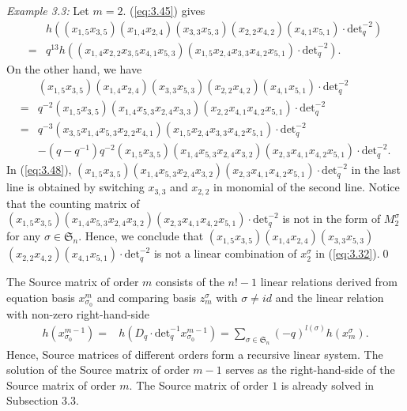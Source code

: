 \documentclass[table,a4paper,reqno]{amsart}
\numberwithin{equation}{section}
\theoremstyle{definition}
\begin{document}
\textit{Example 3.3:} Let $m=2$. (\ref{eq:3.45}) gives
\begin{equation}
    \begin{split}
        &h\left((x_{1,5}x_{3,5})(x_{1,4}x_{2,4})(x_{3,3}x_{5,3})(x_{2,2}x_{4,2})(x_{4,1}x_{5,1})\cdot\text{det}_q^{-2}\right)\\
    =&q^{13}h\left((x_{1,4}x_{2,2}x_{3,5}x_{4,1}x_{5,3})(x_{1,5}x_{2,4}x_{3,3}x_{4,2}x_{5,1})\cdot\text{det}_q^{-2}\right).
    \end{split}
\end{equation}
On the other hand, we have
\begin{equation}\label{eq:3.48}
    \begin{split}
        &(x_{1,5}x_{3,5})(x_{1,4}x_{2,4})(x_{3,3}x_{5,3})(x_{2,2}x_{4,2})(x_{4,1}x_{5,1})\cdot\text{det}_q^{-2}\\
        =&q^{-2}(x_{1,5}x_{3,5})(x_{1,4}x_{5,3}x_{2,4}x_{3,3})(x_{2,2}x_{4,1}x_{4,2}x_{5,1})\cdot\text{det}_q^{-2}\\
        =&q^{-3}(x_{3,5}x_{1,4}x_{5,3}x_{2,2}x_{4,1})(x_{1,5}x_{2,4}x_{3,3}x_{4,2}x_{5,1})\cdot\text{det}_q^{-2}\\
        &-(q-q^{-1})q^{-2}(x_{1,5}x_{3,5})(x_{1,4}x_{5,3}x_{2,4}x_{3,2})(x_{2,3}x_{4,1}x_{4,2}x_{5,1})\cdot\text{det}_q^{-2}.
    \end{split}
\end{equation}
In (\ref{eq:3.48}), $(x_{1,5}x_{3,5})(x_{1,4}x_{5,3}x_{2,4}x_{3,2})(x_{2,3}x_{4,1}x_{4,2}x_{5,1})\cdot\text{det}_q^{-2}$ in the last line is obtained by switching $x_{3,3}$ and $x_{2,2}$ in monomial of the second line. Notice that the counting matrix of $(x_{1,5}x_{3,5})(x_{1,4}x_{5,3}x_{2,4}x_{3,2})(x_{2,3}x_{4,1}x_{4,2}x_{5,1})\cdot\text{det}_q^{-2}$ is not in the form of $M_2^\sigma$ for any $\sigma\in\mathfrak{S}_n$. Hence, we conclude that $(x_{1,5}x_{3,5})(x_{1,4}x_{2,4})(x_{3,3}x_{5,3})$\\$(x_{2,2}x_{4,2})(x_{4,1}x_{5,1})\cdot\text{det}_q^{-2}$ is not a linear combination of $x_2^\sigma$ in (\ref{eq:3.32}).\qed


The Source matrix of order $m$ consists of the $n!-1$ linear relations derived from equation basis $x^m_{\sigma_0}$ and comparing basis $z_m^\sigma$ with $\sigma\ne id$ and the linear relation with non-zero right-hand-side
\begin{align}\label{eq:3.49}
    h(x_{\sigma_0}^{m-1})=&h(D_q\cdot \text{det}_q^{-1}x_{\sigma_0}^{m-1})=\sum_{\sigma\in\mathfrak{S}_n}(-q)^{l(\sigma)}h(x_m^\sigma).
\end{align}
Hence, Source matrices of different orders form a recursive linear system. The solution of the Source matrix of order $m-1$ serves as the right-hand-side of the Source matrix of order $m$. The Source matrix of order $1$ is already solved in Subsection 3.3.
\end{document}
